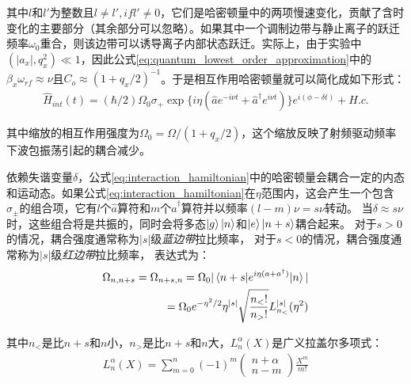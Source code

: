 其中$l$和$l'$为整数且$l\neq l', if l'\neq 0$，它们是哈密顿量中的两项慢速变化，贡献了含时变化的主要部分（其余部分可以忽略）。如果其中一个调制边带与静止离子的跃迁频率$\omega_0$重合，则该边带可以诱导离子内部状态跃迁。实际上，由于实验中$(|a_x|,q_x^2)\ll 1$，因此公式\eqref{eq:quantum_lowest_order_approximation}中的$\beta_x\omega_{rf}\approx\nu$且$C_o\approx(1+q_x/2)^{-1}$。于是相互作用哈密顿量就可以简化成如下形式：
\begin{align}
    \hat{H}_{int}(t)=(\hbar/2)\Omega_0\sigma_+ \exp\{i\eta(\hat{a}e^{-i\nu t}+\hat{a}^\dagger e^{i\nu t})\}e^{i(\phi-\delta t)}+ H.c. \label{eq:interaction_hamiltonian}
\end{align}

其中缩放的相互作用强度为$\Omega_0=\Omega/(1+q_x/2)$，这个缩放反映了射频驱动频率下波包振荡引起的耦合减少。



依赖失谐变量$\delta$，公式\eqref{eq:interaction_hamiltonian}中的哈密顿量会耦合一定的内态和运动态。如果公式\eqref{eq:interaction_hamiltonian}在$\eta$范围内，这会产生一个包含$\sigma_{\pm}$的组合项，它有$l$个$\hat{a}$算符和$m$个$\hat{a}^\dagger$算符并以频率$(l-m)\nu=s\nu$转动。
当$\delta\approx s\nu$时，这些组合将是共振的，同时会将多态$\ket{g}\ket{n}$和$\ket{e}\ket{n+s}$耦合起来。
对于$s>0$的情况，耦合强度通常称为$|s|$级\emph{蓝边带}拉比频率，
对于$s<0$的情况，耦合强度通常称为$|s|$级\emph{红边带}拉比频率，
表达式为\cite[]{Leibfried_Meekhof_King_Monroe_Itano_Wineland_2002, Beige_Bose_Braun_Huelga_Knight_Plenio_Vedral_2000}：
\begin{align}
    \Omega_{n,n+s}=\Omega_{n+s,n}=\Omega_0|\braket{n+s|e^{i\eta(a+a^\dagger)}|n}|\\
    =\Omega_0 e^{-\eta^2/2}\eta^{|s|}\sqrt{\frac{n_<!}{n_>!}}L_{n_<}^{|s|}(\eta^2)
\end{align}

其中$n_<$是比$n+s$和$n$小，$n_>$是比$n+s$和$n$大，$L_n^\alpha(X)$是广义拉盖尔多项式：
\begin{align}
    L_n^\alpha(X)=\sum_{m=0}^{n}(-1)^m\begin{pmatrix}
        n+\alpha \\ n-m
    \end{pmatrix}\frac{X^m}{m!}
\end{align}

